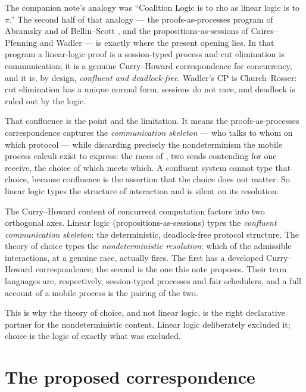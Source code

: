 The companion note's analogy was ``Coalition Logic is to rho as linear logic is to $\pi$.'' The second
half of that analogy --- the proofs-as-processes program of Abramsky and of Bellin--Scott
\cite{abramskyPaP,bellinscott}, and the propositions-as-sessions of Caires--Pfenning and Wadler
\cite{cairespfenning,wadler} --- is exactly where the present opening lies. In that program a
linear-logic proof is a session-typed process and cut elimination is communication; it is a genuine
Curry--Howard correspondence for concurrency, and it is, by design, \emph{confluent and deadlock-free}.
Wadler's CP is Church--Rosser: cut elimination has a unique normal form, sessions do not race, and
deadlock is ruled out by the logic.

That confluence is the point and the limitation. It means the proofs-as-processes correspondence captures
the \emph{communication skeleton} --- who talks to whom on which protocol --- while discarding precisely
the nondeterminism the mobile process calculi exist to express: the races of \chApr, two sends
contending for one receive, the choice of which meets which. A confluent system cannot type that choice,
because confluence is the assertion that the choice does not matter. So linear logic types the structure
of interaction and is silent on its resolution.

\begin{principle}\label{chs:prin:complement}
The Curry--Howard content of concurrent computation factors into two orthogonal axes. Linear logic
(propositions-as-sessions) types the \emph{confluent communication skeleton}: the deterministic,
deadlock-free protocol structure. The theory of choice types the \emph{nondeterministic resolution}:
which of the admissible interactions, at a genuine race, actually fires. The first has a developed
Curry--Howard correspondence; the second is the one this note proposes. Their term languages are,
respectively, session-typed processes and fair schedulers, and a full account of a mobile process is
the pairing of the two.
\end{principle}

\noindent
This is why the theory of choice, and not linear logic, is the right declarative partner for the
nondeterministic content. Linear logic deliberately excluded it; choice is the logic of exactly what
was excluded.

\section{The proposed correspondence}\label{chs:sec:corr}

